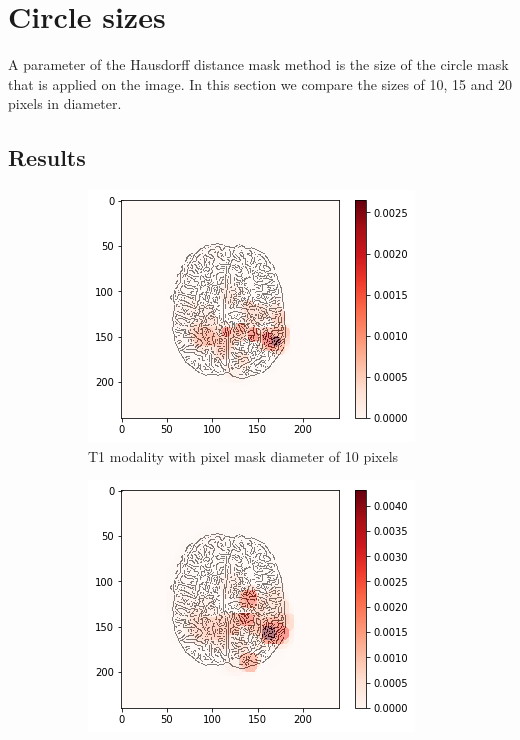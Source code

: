 \section{Circle sizes}
\label{hdm_circle_size}
A parameter of the Hausdorff distance mask method is the size of the circle mask that is applied on the image. In this section we compare the sizes of 10, 15 and 20 pixels in diameter.

\subsection{Results}

\begin{figure}[H]
    \centering
    \begin{subfigure}{.32\textwidth}
        \centering
        \includegraphics[width=\linewidth]{chapters/06_hdm/b_Brats18_TCIA08_242_1_L2/23.png}
        \caption{T1 modality with pixel mask diameter of 10 pixels}
    \end{subfigure}\hfill%
    \begin{subfigure}{.32\textwidth}
        \centering
        \includegraphics[width=\linewidth]{chapters/06_hdm/circle15/3.png}

\end{subfigure}
\end{figure}
